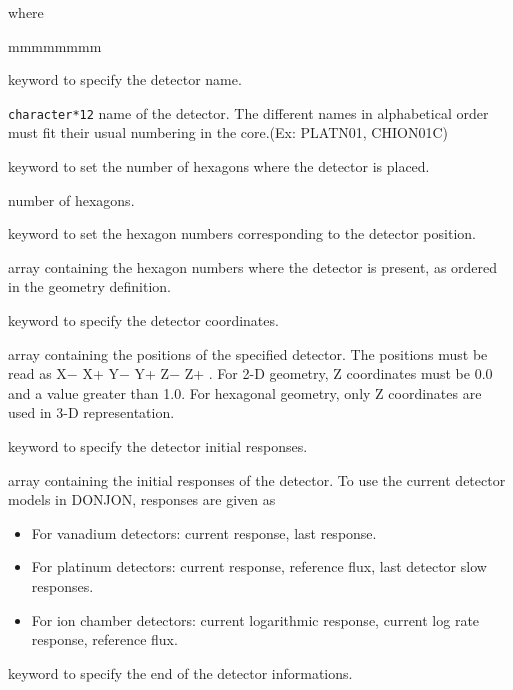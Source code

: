 \noindent where
\begin{ListeDeDescription}{mmmmmmmm}

\item[\moc{NAME}] keyword to specify the detector name.

\item[\dusa{NAMDET}] \texttt{character*12} name of the detector.
The different names in alphabetical order must fit
their usual numbering in the core.(Ex: PLATN01, CHION01C) 

\item[\moc{NHEX}] keyword to set the number of hexagons where the detector
is placed.

\item[\dusa{nhex}] number of hexagons.

\item[\moc{HEX}] keyword to set the hexagon numbers corresponding to
the detector position.

\item[\dusa{ihex}] array containing the hexagon numbers
 where the detector is present, as ordered in the geometry definition. 

\item[\moc{POSITION}] keyword to specify the detector coordinates.

\item[\dusa{pos}] array containing the positions of the specified detector.
The positions must be read as X$-$ X+ Y$-$ Y+ Z$-$ Z+ . For 2-D geometry,
Z coordinates must be 0.0 and a value greater than 1.0. For hexagonal geometry,
only Z coordinates are used in 3-D representation.

\item[\moc{RESP}] keyword to specify the detector initial responses.

\item[\dusa{rep}] array containing the initial responses of the detector.
To use the current detector models in DONJON, responses are given as

\begin{itemize}
\item For vanadium detectors: current response, last response.
\item For platinum detectors: current response, reference flux, last
detector slow 
responses.
\item For ion chamber detectors: current logarithmic response, current
log rate response, 
reference flux.
\end{itemize}
 
\item[\moc{ENDN}] keyword to specify the end of the detector informations.

\end{ListeDeDescription}
\clearpage
